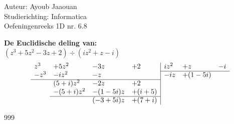 \documentclass[a4paper]{article}
\begin{document}
  
\noindent \large Auteur: Ayoub Jaaouan          \\
\noindent \large Studierichting: Informatica   \\ 
\noindent \large Oefeningenreeks 1D nr. 6.8   \\

\medskip

\normalsize

\textbf{De Euclidische deling van:} \\

$(z^3 + 5z^2 -3z+2) \div (iz^2+z-i)$\\


\[
\begin{array}{llll|lll}
z^3  & +5z^2 & -3z & +2 & iz^2     & +z & -i  \\ \cline{5-7}
-z^3 & -iz^2 &  -z &   & -iz & + (1-5i) &  \\ \cline{1-4}
 & (5+i)z^2 & -2z & +2 &  \\
 & -(5+i)z^2 & -(1-5i)z & +(i+5) & & \\ \cline{2-4}
 &  & (-3+5i)z & + (7+i)&\\
\end{array}
\] 




\begin{thebibliography}{999}
\end{thebibliography}
\end{document}
